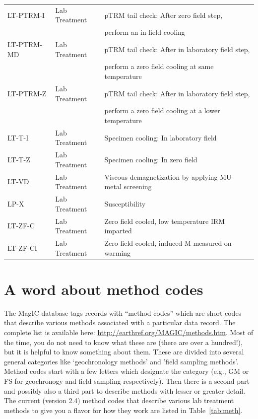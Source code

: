 \documentclass[11pt]{book}
\begin{document}
{{{\begin{table}[h]
\begin{tabular}{lll}
LT-PTRM-I & Lab Treatment & pTRM tail check: After zero field step, \\
&&perform an in field cooling\\
LT-PTRM-MD & Lab Treatment & pTRM tail check: After in laboratory field step, \\
&&perform a zero field cooling at same temperature\\
LT-PTRM-Z & Lab Treatment & pTRM tail check: After in laboratory field step,\\
&& perform a zero field cooling at a lower temperature\\
LT-T-I & Lab Treatment & Specimen cooling: In laboratory field\\
LT-T-Z & Lab Treatment & Specimen cooling: In zero field\\
LT-VD & Lab Treatment & Viscous demagnetization by applying MU-metal screening\\
LP-X & Lab Treatment & Susceptibility\\
LT-ZF-C & Lab Treatment & Zero field cooled, low temperature IRM imparted\\
LT-ZF-CI & Lab Treatment & Zero field cooled, induced M measured on warming\\
\hline
\end{tabular}
\end{table}

  \section{A word about  method codes}
  
  The MagIC database tags records with ``method codes'' which are short codes that describe various methods associated with a particular data record.  The complete list is available here:  \url{http://earthref.org/MAGIC/methods.htm}.      Most of the time, you do not need to know what these are (there are over a hundred!), but it is helpful to know something about them.  These are divided into several general categories like `geochronology methods' and  'field sampling methods'.   Method codes start with a few letters which designate the category (e.g., GM or FS  for geochronogy and field sampling respectively).   Then there is a second part and possibly also a third part to describe methods with lesser or greater detail.   
The current (version 2.4) method codes that describe various lab treatment methods to give you a flavor for how they work are listed in Table~\ref{tab:meth}.    
  


}}}
\end{document}
